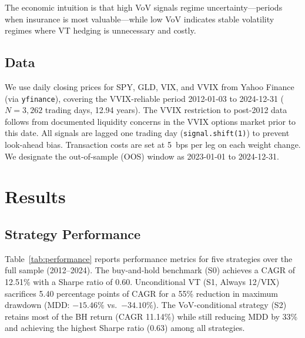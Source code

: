 \documentclass[12pt,a4paper]{article}
\begin{document}
The economic intuition is that high VoV signals regime uncertainty---periods when insurance is most valuable---while low VoV indicates stable volatility regimes where VT hedging is unnecessary and costly.

\subsection{Data}

We use daily closing prices for SPY, GLD, VIX, and VVIX from Yahoo Finance (via \texttt{yfinance}), covering the VVIX-reliable period 2012-01-03 to 2024-12-31 ($N = 3{,}262$ trading days, 12.94 years). The VVIX restriction to post-2012 data follows from documented liquidity concerns in the VVIX options market prior to this date. All signals are lagged one trading day (\texttt{signal.shift(1)}) to prevent look-ahead bias. Transaction costs are set at 5~bps per leg on each weight change. We designate the out-of-sample (OOS) window as 2023-01-01 to 2024-12-31.

\section{Results}
\label{sec:results}

\subsection{Strategy Performance}

Table~\ref{tab:performance} reports performance metrics for five strategies over the full sample (2012--2024). The buy-and-hold benchmark (S0) achieves a CAGR of 12.51\% with a Sharpe ratio of 0.60. Unconditional VT (S1, Always 12/VIX) sacrifices 5.40 percentage points of CAGR for a 55\% reduction in maximum drawdown (MDD: $-15.46\%$ vs.\ $-34.10\%$). The VoV-conditional strategy (S2) retains most of the BH return (CAGR 11.14\%) while still reducing MDD by 33\% and achieving the highest Sharpe ratio (0.63) among all strategies.
\end{document}
